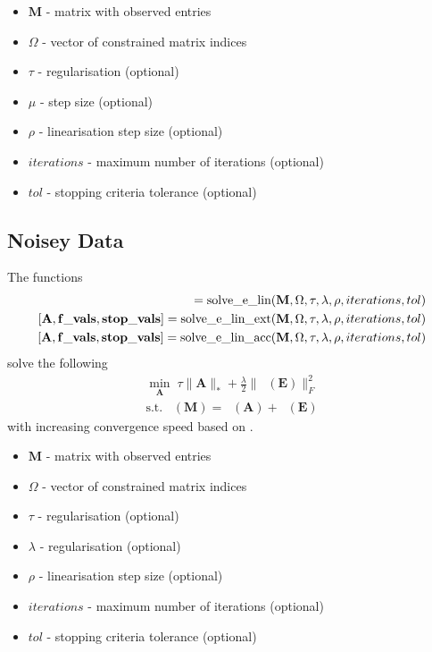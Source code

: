 \documentclass{article}
\DeclareMathOperator*{\pro}{\mathcal P_{\Omega}}
\begin{document}
\begin{itemize}
\item $\mathbf M$ - matrix with observed entries
\item $\Omega$ - vector of constrained matrix indices
\item $\tau$ - regularisation (optional)
\item $\mu$ - step size (optional)
\item $\rho$ - linearisation step size (optional)
\item $iterations$ - maximum number of iterations (optional)
\item $tol$ - stopping criteria tolerance (optional)
\end{itemize}

\subsection{Noisey Data}

The functions
\begin{align}
[ \mathbf A, \mathbf{f\_vals}, \mathbf{stop\_vals} ] = \text{solve\_e\_lin}( \mathbf M, \Omega, \tau, \lambda, \rho, iterations, tol ) \notag \\
[ \mathbf A, \mathbf{f\_vals}, \mathbf{stop\_vals} ] = \text{solve\_e\_lin\_ext}( \mathbf M, \Omega, \tau, \lambda, \rho, iterations, tol ) \notag \\
[ \mathbf A, \mathbf{f\_vals}, \mathbf{stop\_vals} ] = \text{solve\_e\_lin\_acc}( \mathbf M, \Omega, \tau, \lambda, \rho, iterations, tol )\notag 
\end{align}
solve the following
\begin{align}
\min_{\mathbf A} \; \tau \| \mathbf A \|_* + \frac{\lambda}{2} \| \pro (\mathbf E) \|_F^2\\
\text{s.t.} \; \pro (\mathbf M) = \pro (\mathbf A) + \pro (\mathbf E) \nonumber 
\end{align}
with increasing convergence speed based on \cite{ji2009accelerated}.

\begin{itemize}
\item $\mathbf M$ - matrix with observed entries
\item $\Omega$ - vector of constrained matrix indices
\item $\tau$ - regularisation (optional)
\item $\lambda$ - regularisation (optional)
\item $\rho$ - linearisation step size (optional)
\item $iterations$ - maximum number of iterations (optional)
\item $tol$ - stopping criteria tolerance (optional)
\end{itemize}

\newpage


\end{document}
